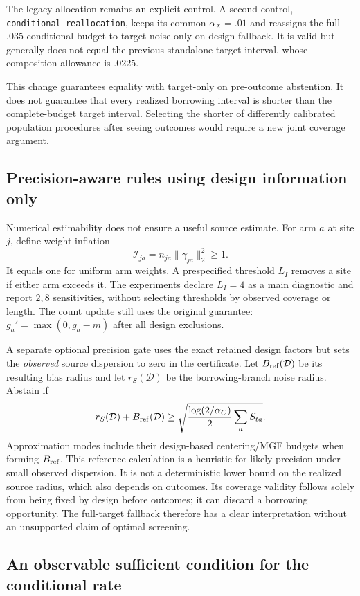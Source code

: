 The legacy allocation remains an explicit control. A second control,
\texttt{conditional\_reallocation}, keeps its common $\alpha_X=.01$ and
reassigns the full $.035$ conditional budget to target noise only on design
fallback. It is valid but generally does not equal the previous standalone
target interval, whose composition allowance is $.0225$.

This change guarantees equality with target-only on pre-outcome abstention.
It does not guarantee that every realized borrowing interval is shorter than
the complete-budget target interval. Selecting the shorter of differently
calibrated population procedures after seeing outcomes would require a new
joint coverage argument.

\subsection{Precision-aware rules using design information only}

Numerical estimability does not ensure a useful source estimate. For arm
$a$ at site $j$, define weight inflation
\[
 \mathcal I_{ja}=n_{ja}\|\gamma_{ja}\|_2^2\ge1.
\]
It equals one for uniform arm weights. A prespecified threshold $L_I$ removes
a site if either arm exceeds it. The experiments declare $L_I=4$ as a main
diagnostic and report $2,8$ sensitivities, without selecting thresholds by
observed coverage or length. The count update still uses the original
guarantee: $g_a'=\max(0,g_a-m)$ after all design exclusions.

A separate optional precision gate uses the exact retained design factors
but sets the \emph{observed} source dispersion to zero in the certificate.
Let $B_{\rm ref}(\mathcal D)$ be its resulting bias radius and let
$r_S(\mathcal D)$ be the borrowing-branch noise radius. Abstain if
\[
 r_S(\mathcal D)+B_{\rm ref}(\mathcal D)
 \ge \sqrt{\frac{\log(2/\alpha_C)}2\sum_a S_{ta}}.
\]
Approximation modes include their design-based centering/MGF budgets when
forming $B_{\rm ref}$. This reference calculation is a heuristic for likely
precision under small observed dispersion. It is not a deterministic lower
bound on the realized source radius, which also depends on outcomes. Its
coverage validity follows solely from being fixed by design before outcomes;
it can discard a borrowing opportunity. The full-target fallback therefore
has a clear interpretation without an unsupported claim of optimal screening.

\subsection{An observable sufficient condition for the conditional rate}

